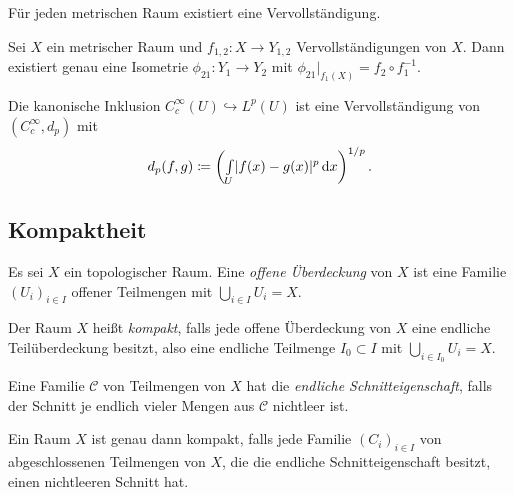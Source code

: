 \documentclass{cheat-sheet}
\begin{document}
\begin{satz}
  Für jeden metrischen Raum existiert eine Vervollständigung. %
\end{satz}

\begin{prop}
  Sei $X$ ein metrischer Raum und $f_{1,2} : X \to Y_{1,2}$ Vervollständigungen von $X$. Dann existiert genau eine Isometrie $\phi_{21} : Y_1 \to Y_2$ mit $\phi_{21}|_{f_1(X)} = f_2 \circ f_1^{-1}$.
\end{prop}

\begin{bsp}
  Die kanonische Inklusion $C_c^{\infty}(U) \hookrightarrow L^p(U)$ ist eine Vervollständigung von $(C_c^{\infty}, d_p)$ mit
  \[ d_p(f, g) \coloneqq \left( {\textstyle \int\limits_{U}^{}} \lvert f(x) - g(x)\rvert^p \,\mathrm{d} x \right)^{1/p}. \]
\end{bsp}

\begin{samepage}

\section{Kompaktheit}

\begin{defn}
  Es sei $X$ ein topologischer Raum. Eine \emph{offene Überdeckung} von $X$ ist eine Familie $(U_i)_{i \in I}$ offener Teilmengen mit $\bigcup_{i \in I} U_i = X$.
\end{defn}

\begin{defn}
  Der Raum $X$ heißt \emph{kompakt}, falls jede offene Überdeckung von $X$ eine endliche Teilüberdeckung besitzt, also eine endliche Teilmenge $I_0 \subset I$ mit $\bigcup_{i \in I_0} U_i = X$.
\end{defn}

\begin{defn}
  Eine Familie $\mathcal{C}$ von Teilmengen von $X$ hat die \emph{endliche Schnitteigenschaft}, falls der Schnitt je endlich vieler Mengen aus $\mathcal{C}$ nichtleer ist.
\end{defn}

\end{samepage}

\begin{prop}
  Ein Raum $X$ ist genau dann kompakt, falls jede Familie $(C_i)_{i \in I}$ von abgeschlossenen Teilmengen von $X$, die die endliche Schnitteigenschaft besitzt, einen nichtleeren Schnitt hat. %
\end{prop}
\end{document}
